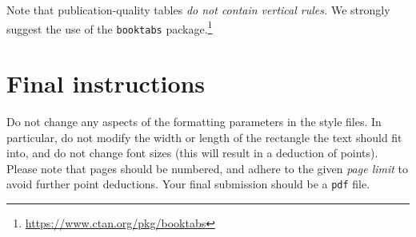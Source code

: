 \documentclass{article}
\begin{document}
Note that publication-quality tables \emph{do not contain vertical rules.} We
strongly suggest the use of the \verb+booktabs+ package.\footnote{\url{https://www.ctan.org/pkg/booktabs}}




\section{Final instructions}

Do not change any aspects of the formatting parameters in the style files. In
particular, do not modify the width or length of the rectangle the text should
fit into, and do not change font sizes (this will result in a deduction of points). 
Please note that pages should be numbered, and adhere to the given \emph{page limit} to avoid further point deductions. Your final submission should be a \texttt{pdf} file.

\end{document}
